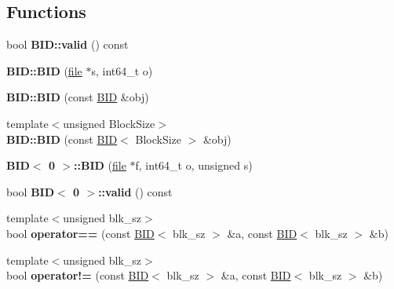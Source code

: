 \subsection*{Functions}
\begin{CompactItemize}
\item 
\hypertarget{group__mnglayer_gdbb5760c51c6719d6b6ab13d2b3c38dd}{
bool \textbf{BID::valid} () const }
\label{group__mnglayer_gdbb5760c51c6719d6b6ab13d2b3c38dd}

\item 
\hypertarget{group__mnglayer_gb0dde5f54bfe601660d1b116098d2ed3}{
\textbf{BID::BID} (\hyperlink{classfile}{file} $\ast$s, int64\_\-t o)}
\label{group__mnglayer_gb0dde5f54bfe601660d1b116098d2ed3}

\item 
\hypertarget{group__mnglayer_g2ae908ccd9bca9712449a3d45b95ec7b}{
\textbf{BID::BID} (const \hyperlink{structBID}{BID} \&obj)}
\label{group__mnglayer_g2ae908ccd9bca9712449a3d45b95ec7b}

\item 
\hypertarget{group__mnglayer_gf485b70a6f5e3ff226342ca5c621b2f9}{
{\footnotesize template$<$unsigned BlockSize$>$ }\\\textbf{BID::BID} (const \hyperlink{structBID}{BID}$<$ BlockSize $>$ \&obj)}
\label{group__mnglayer_gf485b70a6f5e3ff226342ca5c621b2f9}

\item 
\hypertarget{group__mnglayer_g0bcd10c5f95291a7e112c6d37382c6b2}{
\textbf{BID$<$ 0 $>$::BID} (\hyperlink{classfile}{file} $\ast$f, int64\_\-t o, unsigned s)}
\label{group__mnglayer_g0bcd10c5f95291a7e112c6d37382c6b2}

\item 
\hypertarget{group__mnglayer_gdd9f3b28293eff6ecb6ed431e4c1973e}{
bool \textbf{BID$<$ 0 $>$::valid} () const }
\label{group__mnglayer_gdd9f3b28293eff6ecb6ed431e4c1973e}

\item 
\hypertarget{group__mnglayer_g04ce0e59d0985d3c82673a230db2ddd1}{
{\footnotesize template$<$unsigned blk\_\-sz$>$ }\\bool \textbf{operator==} (const \hyperlink{structBID}{BID}$<$ blk\_\-sz $>$ \&a, const \hyperlink{structBID}{BID}$<$ blk\_\-sz $>$ \&b)}
\label{group__mnglayer_g04ce0e59d0985d3c82673a230db2ddd1}

\item 
\hypertarget{group__mnglayer_g0850a80a46763a370570069323eae3e7}{
{\footnotesize template$<$unsigned blk\_\-sz$>$ }\\bool \textbf{operator!=} (const \hyperlink{structBID}{BID}$<$ blk\_\-sz $>$ \&a, const \hyperlink{structBID}{BID}$<$ blk\_\-sz $>$ \&b)}
\label{group__mnglayer_g0850a80a46763a370570069323eae3e7}


\end{CompactItemize}
